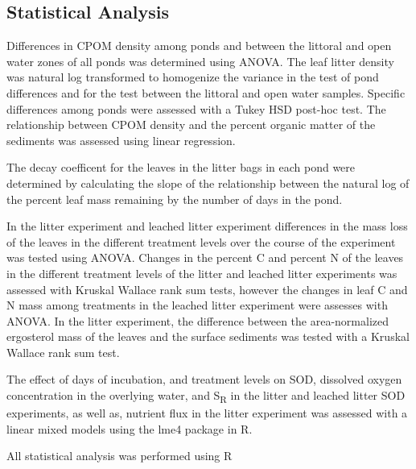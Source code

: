 \subsection{Statistical Analysis}

Differences in CPOM density among ponds and between the littoral and open water zones of all ponds was determined using ANOVA. The leaf litter density was natural log transformed to homogenize the variance in the test of pond differences and for the test between the littoral and open water samples. Specific differences among ponds were assessed with a Tukey HSD post-hoc test. The relationship between CPOM density and the percent organic matter of the sediments was assessed using linear regression.

The decay coefficent for the leaves in the litter bags in each pond were determined by calculating the slope of the relationship between the natural log of the percent leaf mass remaining by the number of days in the pond.

In the litter experiment and leached litter experiment differences in the mass loss of the leaves in the different treatment levels over the course of the experiment was tested using ANOVA. Changes in the percent C and percent N of the leaves in the different treatment levels of the litter and leached litter experiments was assessed with Kruskal Wallace rank sum tests, however the changes in leaf C and N mass among treatments in the leached litter experiment were assesses with ANOVA. In the litter experiment, the difference between the area-normalized ergosterol mass of the leaves and the surface sediments was tested with a Kruskal Wallace rank sum test.

The effect of days of incubation, and treatment levels on SOD, dissolved oxygen concentration in the overlying water,  and S\textsubscript{R} in the litter and leached litter SOD experiments, as well as, nutrient flux in the litter experiment was assessed with a linear mixed models using the lme4 package \cite{lme4} in R.

All statistical analysis was performed using R \cite{R}

